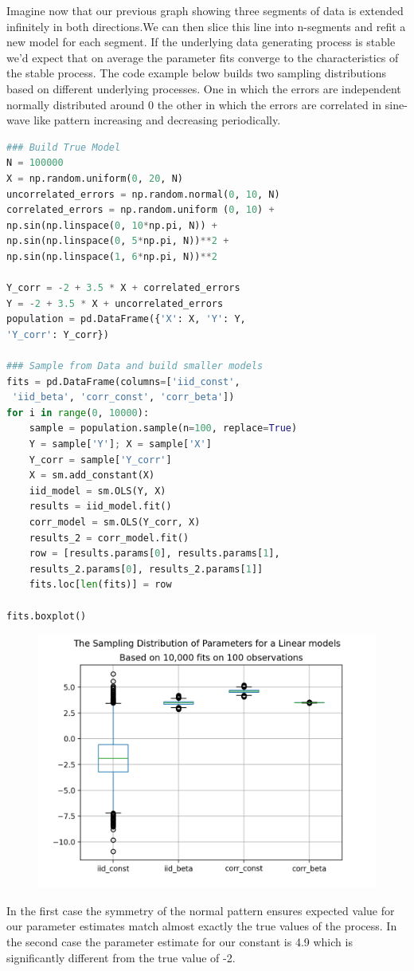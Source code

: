 \documentclass[10pt,a4paper,notitlepage,twocolumn]{article}
\begin{document}
\noindent Imagine now that our previous graph showing three segments of data is extended infinitely in both directions.We can then slice this line into n-segments and refit a new model for each segment. If the underlying data generating process is stable we'd expect that on average the parameter fits converge to the characteristics of the stable process. 
The code example below builds two sampling distributions based on different underlying processes.  One in which the errors are independent normally distributed around 0 the other in which the errors are correlated in sine-wave like pattern increasing and decreasing periodically. 
\begin{lstlisting}[language=Python]
### Build True Model
N = 100000
X = np.random.uniform(0, 20, N)
uncorrelated_errors = np.random.normal(0, 10, N)
correlated_errors = np.random.uniform (0, 10) + 
np.sin(np.linspace(0, 10*np.pi, N)) + 
np.sin(np.linspace(0, 5*np.pi, N))**2 + 
np.sin(np.linspace(1, 6*np.pi, N))**2

Y_corr = -2 + 3.5 * X + correlated_errors
Y = -2 + 3.5 * X + uncorrelated_errors
population = pd.DataFrame({'X': X, 'Y': Y, 
'Y_corr': Y_corr})

### Sample from Data and build smaller models
fits = pd.DataFrame(columns=['iid_const',
 'iid_beta', 'corr_const', 'corr_beta'])
for i in range(0, 10000):
    sample = population.sample(n=100, replace=True)
    Y = sample['Y']; X = sample['X']
    Y_corr = sample['Y_corr']
    X = sm.add_constant(X)
    iid_model = sm.OLS(Y, X)
    results = iid_model.fit()
    corr_model = sm.OLS(Y_corr, X)
    results_2 = corr_model.fit()
    row = [results.params[0], results.params[1],
    results_2.params[0], results_2.params[1]]
    fits.loc[len(fits)] = row
    
fits.boxplot()
\end{lstlisting}


\begin{figure}[H]
  \includegraphics[width=\linewidth]{./Plots/distribution_of_beta1.png}
\end{figure}

In the first case the symmetry of the normal pattern ensures expected value for our parameter estimates match almost exactly the true values of the process. In the second case the parameter estimate for our constant is 4.9 which is significantly different from the true value of -2.
\end{document}
